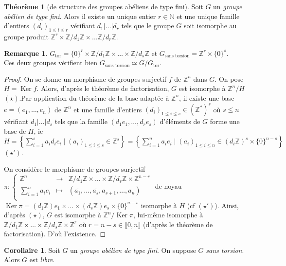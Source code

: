 \documentclass{report}
\newcommand{\Z}{\mathbb{Z}}
\newcommand{\N}{\mathbb{N}}
\renewcommand{\ker}{\mathop{\mathrm{Ker}}\nolimits}
\newcommand{\Gt}{G_{\mathrm{tor}}}
\newcommand{\dis}{\displaystyle}
\newcommand{\nt}[1]{\llbracket  #1 \rrbracket }
\theoremstyle{definition}
\newtheorem{theo}[defi]{Théorème}
\newtheorem{coro}[defi]{Corollaire}
\newtheorem{rem}[defi]{Remarque}
\newcommand{\app}[5]{#1:\left\{\begin{array}{ccl}
#2 & \longrightarrow & #3 \\
#4 & \longmapsto & #5  \\
\end{array}\right.
}
\begin{document}
\begin{theo}[de structure des groupes abéliens de type fini]
Soit $G$ un \textit{groupe abélien de type fini}. Alors il existe un unique entier $r \in \N$ et une unique famille d'entiers $(d_i)_{1 \leqslant i \leqslant r}$ vérifiant $d_1 \vert \ldots \vert d_r$ tels que le groupe $G$ soit isomorphe au groupe produit $\Z^r \times \Z/d_1\Z \times \ldots \Z/d_r\Z$. 
\end{theo}

\begin{rem}
$\Gt=\{0\}^r \times \Z/d_1\Z \times \ldots \times \Z/d_s\Z$ et $G_{\textrm{sans torsion}}=\Z^r \times \{0\}^{s}$.\\
Ces deux groupes v\'erifient bien $G_{\textrm{sans torsion}}\simeq G/\Gt$.
\end{rem}


\begin{proof}
On se donne un morphisme de groupes surjectif $f$ de $\Z^n$ dans $G$. On pose $H=\ker f$. Alors, d'après le théorème de factorisation, $G$ est isomorphe à $\Z^n/H$ $(\star)$.Par application du théorème de la base adaptée à $\Z^n$, il existe une base $e=(e_1, \ldots, e_n)$ de $\Z^n$ et une famille d'entiers $(d_i)_{1 \leqslant i \leqslant s} \in (\Z^*)^s$ où $s \leqslant n$ vérifiant $d_1 \vert \ldots \vert d_s$ tels que la famille $(d_1e_1, \ldots, d_re_s)$ d'éléments de $G$ forme une base de $H$, ie $H=\left\{\dis \sum_{i=1}^s a_id_ie_i \mid (a_i)_{1 \leqslant i \leqslant s} \in \Z^s \right\}=\left\{\dis \sum_{i=1}^n a_ie_i \mid (a_i)_{1 \leqslant i \leqslant n} \in (d_i\Z)^s\times\{0\}^{n-s} \right\}$ $(\star ')$. 

On considère le morphisme de groupes surjectif $\app{\pi}{\Z^n}{\Z/d_1\Z \times \ldots \times \Z/d_r\Z \times \Z^{n-r}}{\dis \sum_{i=1}^na_ie_i}{(\overline{a_1}, \ldots, \overline{a_s},a_{s+1}, \ldots, a_n)}$ de noyau $\ker \pi=(d_1\Z )e_1 \times \ldots \times (d_s\Z)e_s \times \{0\}^{n-s}$ isomorphe à $H$ (cf $(\star ')$). 
Ainsi, d'après $(\star)$, $G$ est isomorphe à $\Z^n/\ker \pi$, lui-même isomorphe à $\Z/d_1\Z \times \ldots \times \Z/d_s\Z \times \Z^{r}$ où $r=n-s \in \nt{0,n}$ (d'après le théorème de factorisation). D'où l'existence. 
\end{proof}

\begin{coro}
Soit $G$ un \textit{groupe abélien de type fini}. On suppose $G$ \textit{sans torsion}. Alors $G$ est \textit{libre}.
\end{coro}
\end{document}
